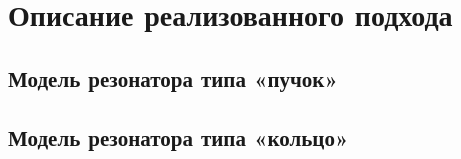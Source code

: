 \chapter{Описание реализованного подхода}

\section{Модель резонатора типа «пучок»}\label{sec:bundle}


\newpage

\section{Модель резонатора типа «кольцо»}\label{sec:ring}




